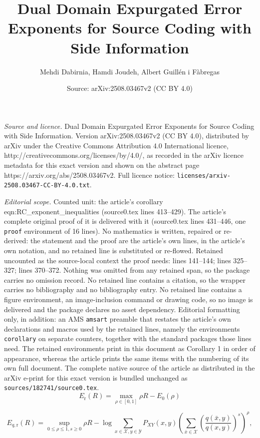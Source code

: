 \documentclass[10pt,a4paper]{amsart}
\title{Dual Domain Expurgated Error Exponents for Source Coding with Side Information}
\author{Mehdi Dabirnia, Hamdi Joudeh, Albert Guill\'en i F\`abregas}
\date{Source: arXiv:2508.03467v2 (CC BY 4.0)}
\newcommand{\Xc}{\mathcal{X}}
\newcommand{\Yc}{\mathcal{Y}}
\begin{document}
\maketitle

\noindent\emph{Source and licence.} Dual Domain Expurgated Error Exponents for Source Coding with Side Information. Version arXiv:2508.03467v2 (CC BY 4.0), distributed by arXiv under the Creative Commons Attribution 4.0 International licence, http://creativecommons.org/licenses/by/4.0/, as recorded in the arXiv licence metadata for this exact version and shown on the abstract page https://arxiv.org/abs/2508.03467v2. Full licence notice: \texttt{licenses/arxiv-2508.03467-CC-BY-4.0.txt}.\par\smallskip

\noindent\textit{Editorial scope.} Counted unit: the article's corollary eqn:RC\_exponent\_inequalities (source0.tex lines 413--429). The article's complete original proof of it is delivered with it (source0.tex lines 431--446, one \texttt{proof} environment of 16 lines). No mathematics is written, repaired or re-derived: the statement and the proof are the article's own lines, in the article's own notation, and no retained line is substituted or re-flowed.  Retained uncounted as the source-local context the proof needs: lines 141--144; lines 325--327; lines 370--372.  Nothing was omitted from any retained span, so the package carries no omission record.  No retained line contains a citation, so the wrapper carries no bibliography and no bibliography entry.  No retained line contains a figure environment, an image-inclusion command or drawing code, so no image is delivered and the package declares no asset dependency.  Editorial formatting only, in addition: an AMS \texttt{amsart} preamble that restates the article's own declarations and macros used by the retained lines, namely the environments \texttt{corollary} on separate counters, together with the standard packages those lines need.  The retained environments print in this document as Corollary 1 in order of appearance, whereas the article prints the same items with the numbering of its own full document.  The complete native source of the article as distributed in the arXiv e-print for this exact version is bundled unchanged as \texttt{sources/182741/source0.tex}.
\begin{equation}
\label{eq:Er_dual}
    E_{\mathrm{r}}(R) = \max_{\rho \in [0,1]}  \rho R -  E_{0}(\rho)
\end{equation}

	\begin{equation}
	E_{q,\mathrm{r}}(R) = \sup_{0\leq\rho\leq 1,s\geq 0}\rho R-\log\sum\limits_{x\in\Xc,y\in\Yc}P_{XY}(x,y)\left(\sum\limits_{\bar{x}\in\Xc}\left(\frac{q(\bar{x},y)}{q(x,y)}\right)^s\right)^{\rho},\label{eqn:exp_St_RC}
\end{equation}
\end{document}
